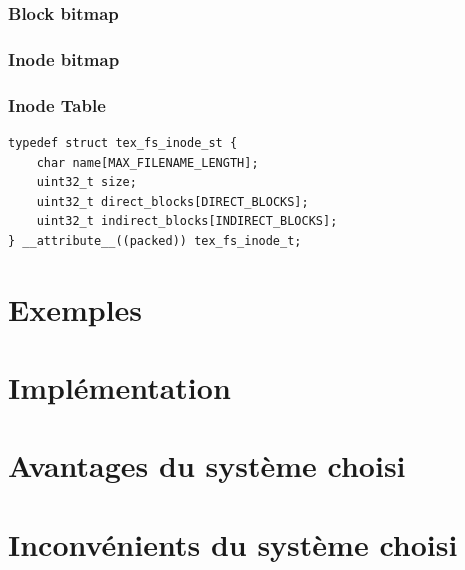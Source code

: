 \documentclass{article}
\begin{document}
\subsubsection{Block bitmap}
\subsubsection{Inode bitmap}
\subsubsection{Inode Table}
\begin{verbatim}
typedef struct tex_fs_inode_st {
    char name[MAX_FILENAME_LENGTH];
    uint32_t size;
    uint32_t direct_blocks[DIRECT_BLOCKS];
    uint32_t indirect_blocks[INDIRECT_BLOCKS];
} __attribute__((packed)) tex_fs_inode_t;
\end{verbatim}

\section{Exemples}
\section{Implémentation}
\section{Avantages du système choisi}
\section{Inconvénients du système choisi}
\end{document}
